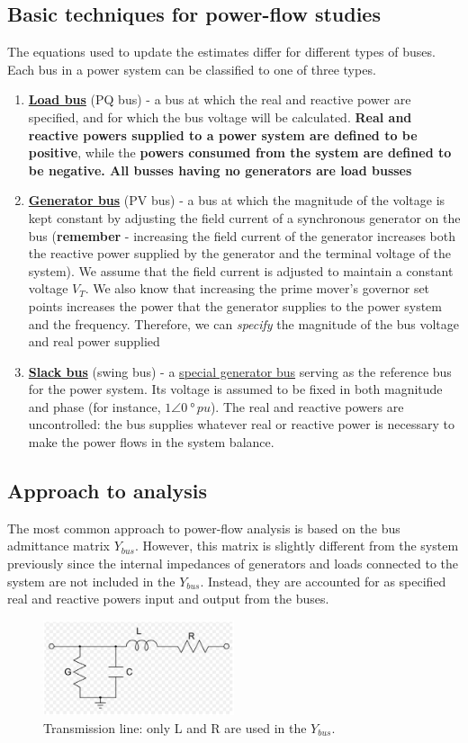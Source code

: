 \subsection{Basic techniques for power-flow studies}
The equations used to update the estimates differ for different types of buses. Each bus in a power system can be classified to one of three types.
\begin{enumerate}
	\item \textbf{\underline{Load bus}} (PQ bus) - a bus at which the real and reactive power are specified, and for which the bus voltage will be calculated. \textbf{Real and reactive powers supplied to a power system are defined to be positive}, while the \textbf{powers consumed from the system are defined to be negative. All busses having no generators are load busses}
	\item \textbf{\underline{Generator bus}} (PV bus) - a bus at which the magnitude of the voltage is kept constant by adjusting the field current of a synchronous generator on the bus (\textbf{remember} - increasing the field current of the generator increases both the reactive power supplied by the generator and the terminal voltage of the system). We assume that the field current is adjusted to maintain a constant voltage $V_T$. We also know that increasing the prime mover's governor set points increases the power that the generator supplies to the power system and the frequency. Therefore, we can \textit{specify} the magnitude of the bus voltage and real power supplied
	\item \textbf{\underline{Slack bus}} (swing bus) - a \underline{special generator bus} serving as the reference bus for the power system. Its voltage is assumed to be fixed in both magnitude and phase (for instance, $1\angle\SI{0}{\degree}\, \si{pu}$). The real and reactive powers are uncontrolled: the bus supplies whatever real or reactive power is necessary to make the power flows in the system balance.
\end{enumerate}
\subsection{Approach to analysis}
The most common approach to power-flow analysis is based on the bus admittance matrix $Y_{bus}$. However, this matrix is slightly different from the system previously since the internal impedances of generators and loads connected to the system are not included in the $Y_{bus}$. Instead, they are accounted for as specified real and reactive powers input and output from the buses.
\begin{figure}[H]
	\centering
	\includegraphics[width = 0.5\textwidth]{./img/figure49.png}
	\caption{Transmission line: only L and R are used in the $Y_{bus}$.}
\end{figure}
